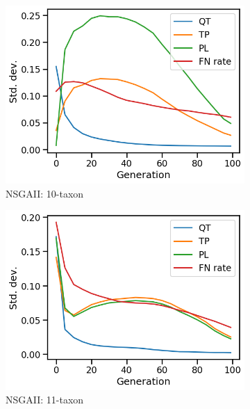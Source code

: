 \begin{figure}[!htbp]
	\centering
	\begin{adjustwidth}{-1cm}{-1cm}
		\begin{subfigure}[b]{0.4\textwidth}
			\includegraphics[width=\textwidth]{Figure/10-taxon_NSGAII_std_dev}
			\caption{NSGAII: 10-taxon}
		\end{subfigure}%
		\begin{subfigure}[b]{0.4\textwidth}
			\includegraphics[width=\textwidth]{Figure/11-taxon_NSGAII_std_dev}
			\caption{NSGAII: 11-taxon}
		\end{subfigure}%
		\begin{subfigure}[b]{0.4\textwidth}

\end{subfigure}
\end{adjustwidth}
\end{figure}
